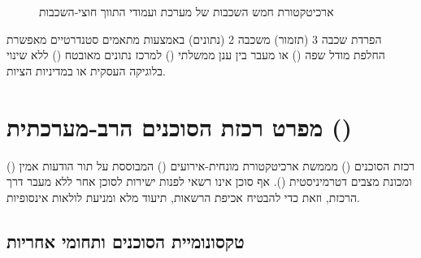 \begin{figure}[htbp]
\begin{ltrblock}
\end{ltrblock}
\caption{ארכיטקטורת חמש השכבות של מערכת  ועמודי התווך חוצי-השכבות}
\label{fig:five-layer}
\end{figure}

\begin{insightbox}
הפרדת שכבה 3 (תזמור) משכבה 2 (נתונים) באמצעות מתאמים סטנדרטיים מאפשרת החלפת מודל שפה () או מעבר בין ענן ממשלתי () למרכז נתונים מאובטח () ללא שינוי בלוגיקה העסקית או במדיניות הציות.
\end{insightbox}

\section{מפרט רכזת הסוכנים הרב-מערכתית ()}
\label{sec:agent-hub}

רכזת הסוכנים () מממשת ארכיטקטורת  מונחית-אירועים () המבוססת על תור הודעות אמין () ומכונת מצבים דטרמיניסטית (). אף סוכן אינו רשאי לפנות ישירות לסוכן אחר ללא מעבר דרך הרכזת, וזאת כדי להבטיח אכיפת הרשאות, תיעוד מלא ומניעת לולאות אינסופיות.

\subsection{טקסונומיית הסוכנים ותחומי אחריות}

